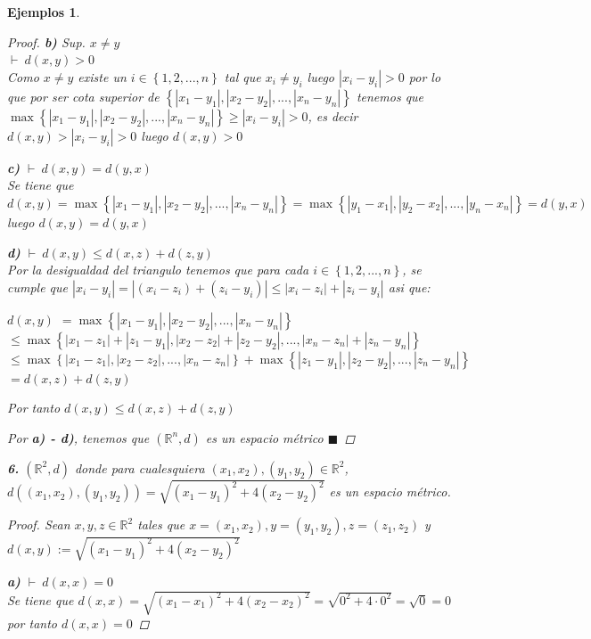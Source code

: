\documentclass[oneside]{book} %
\theoremstyle{Teorema}
\theoremstyle{Ejemplos}
\newtheorem{Ejemplos}[Definicion]{Ejemplos}
\theoremstyle{[Obs]}
\newcommand{\abs}[1]{\left|#1\right|} %
\renewcommand{\{}{\left\lbrace} %
\renewcommand{\}}{\right\rbrace} %
\newcommand{\Rn}{\mathbb{R}^n} %
\newcommand{\Ri}[1]{\mathbb{R}^{#1}} %
\renewcommand{\qed}{$\blacksquare$} %
\newcommand{\pd}{$\vdash\ $} %
\begin{document}
\begin{Ejemplos}
\begin{proof}
					\textbf{b)} Sup. $x \neq y$ \\
					\pd $d(x, y) > 0$ \\
					Como $x \neq y$ existe un $i \in \{ 1, 2, ..., n \}$ tal que $x_i \neq y_i$ luego $\abs{x_i - y_i} > 0$ por lo que por ser cota superior de $\{\abs{x_1 - y_1}, \abs{x_2 - y_2}, ..., \abs{x_n - y_n}\}$ tenemos que $\max\{\abs{x_1 - y_1}, \abs{x_2 - y_2}, ..., \abs{x_n - y_n}\} \geq \abs{x_i - y_i} > 0$, es decir $d(x, y) > \abs{x_i - y_i} > 0$ luego $d(x, y) > 0$ 

					\textbf{c)} \pd $d(x, y) = d(y, x)$ \\
					Se tiene que $d(x, y) = \max\{\abs{x_1 - y_1}, \abs{x_2 - y_2}, ..., \abs{x_n - y_n}\} = \max\{\abs{y_1 - x_1}, \abs{y_2 - x_2}, ..., \abs{y_n - x_n}\} = d(y, x)$ luego $d(x, y) = d(y, x)$ 

					\textbf{d)} \pd $d(x, y) \leq d(x, z) + d(z, y)$ \\
					Por la desigualdad del triangulo tenemos que para cada $i \in \{ 1, 2, ..., n \}$, se cumple que $\abs{x_i - y_i} = \abs{(x_i - z_i) + (z_i - y_i)} \leq \abs{x_i - z_i} + \abs{z_i - y_i}$ asi que: 
					
					$d(x, y)$
					$=\max\{ \abs{x_1 - y_1}, \abs{x_2 - y_2}, ...,\abs{x_n - y_n} \}$ \\
					$\leq \max\{ \abs{x_1 - z_1} + \abs{z_1 - y_1}, \abs{x_2 - z_2} + \abs{z_2 - y_2}, ...,\abs{x_n - z_n} + \abs{z_n - y_n} \}$ \\
					$\leq \max\{ \abs{x_1 - z_1}, \abs{x_2 - z_2}, ...,\abs{x_n - z_n} \} + \max\{ \abs{z_1 - y_1}, \abs{z_2 - y_2}, ..., \abs{z_n - y_n} \}$ \\
					$= d(x, z) + d(z, y)$
					
					Por tanto $d(x, y) \leq d(x, z) + d(z, y)$

					Por \textbf{a) - d)}, tenemos que $(\Rn, d)$ es un espacio métrico \qed 

				\end{proof}

				\textbf{6.} $(\Ri{2}, d)$ donde para cualesquiera $(x_1, x_2), (y_1, y_2) \in \Ri{2}$, $d((x_1, x_2), (y_1, y_2)) = \sqrt{(x_1 - y_1)^2 + 4(x_2 - y_2)^2}$ es un espacio métrico. 

				\begin{proof}
					
					Sean $x, y, z \in \Ri{2}$ tales que $x = (x_1, x_2), y = (y_1, y_2), z = (z_1, z_2)$ y $d(x, y) := \sqrt{(x_1 - y_1)^2 + 4(x_2 - y_2)^2}$

					\textbf{a)} \pd $d(x, x) = 0$ \\
					Se tiene que $d(x, x) = \sqrt{(x_1 - x_1)^2 + 4(x_2 - x_2)^2} = \sqrt{0^2 + 4 \cdot 0^2} = \sqrt{0} = 0$ por tanto $d(x, x) = 0$ 


\end{proof}
\end{Ejemplos}
\end{document}
